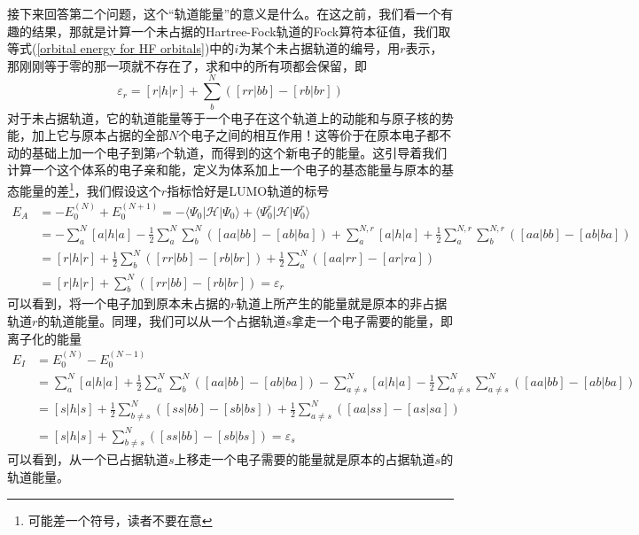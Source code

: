 \documentclass[12pt,a4paper,openany,twoside]{book}
\numberwithin{equation}{section}
\begin{document}
          接下来回答第二个问题，这个“轨道能量”的意义是什么。在这之前，我们看一个有趣的结果，那就是计算一个未占据的Hartree-Fock轨道的Fock算符本征值，我们取等式(\ref{orbital energy for HF orbitals})中的$i$为某个未占据轨道的编号，用$r$表示，那刚刚等于零的那一项就不存在了，求和中的所有项都会保留，即
          \begin{equation}
            \varepsilon_r=[r|h|r] + \sum_{b}^N([rr|bb] - [rb|br])
            \label{orbital energy for virtual}
          \end{equation}
          对于未占据轨道，它的轨道能量等于一个电子在这个轨道上的动能和与原子核的势能，加上它与原本占据的全部$N$个电子之间的相互作用！这等价于在原本电子都不动的基础上加一个电子到第$r$个轨道，而得到的这个新电子的能量。这引导着我们计算一个这个体系的电子亲和能，定义为体系加上一个电子的基态能量与原本的基态能量的差\footnote{可能差一个符号，读者不要在意}，我们假设这个$r$指标恰好是LUMO轨道的标号
          \begin{equation}
            \begin{aligned}
              E_A &= -E_0^{(N)} + E_0^{(N+1)} = -\langle \Psi_0|\mathscr{H}|\Psi_0\rangle + \langle \Psi_0^r|\mathscr{H}|\Psi_0^r\rangle \\
              &=-\sum_a^N [a|h|a] - \frac{1}{2}\sum_a^N \sum_b^N([aa|bb] - [ab|ba]) + \sum_a^{N,r} [a|h|a] + \frac{1}{2}\sum_a^{N,r} \sum_b^{N,r}([aa|bb] - [ab|ba])\\
              &=  [r|h|r]  +  \frac{1}{2}\sum_b^{N}([rr|bb] - [rb|br]) +  \frac{1}{2}\sum_a^{N}([aa|rr] - [ar|ra])\\
              &= [r|h|r] + \sum_b^{N}([rr|bb] - [rb|br]) =\varepsilon_r
            \end{aligned}
          \end{equation}
          可以看到，将一个电子加到原本未占据的$r$轨道上所产生的能量就是原本的非占据轨道$r$的轨道能量。同理，我们可以从一个占据轨道$s$拿走一个电子需要的能量，即离子化的能量
          \begin{equation}
            \begin{aligned}
              E_I &= E_0^{(N)} - E_0^{(N-1)} \\
              &= \sum_a^N [a|h|a] + \frac{1}{2}\sum_a^N \sum_b^N([aa|bb] - [ab|ba]) - \sum_{a\neq s}^{N} [a|h|a] - \frac{1}{2}\sum_{a\neq s}^{N} \sum_{a\neq s}^{N}([aa|bb] - [ab|ba])\\
              &=  [s|h|s]  +  \frac{1}{2}\sum_{b\neq s}^{N}([ss|bb] - [sb|bs]) +  \frac{1}{2}\sum_{a\neq s}^{N}([aa|ss] - [as|sa])\\
              &= [s|h|s] + \sum_{b\neq s}^{N}([ss|bb] - [sb|bs]) =\varepsilon_s
            \end{aligned}
          \end{equation}
          可以看到，从一个已占据轨道$s$上移走一个电子需要的能量就是原本的占据轨道$s$的轨道能量。
          
\end{document}
